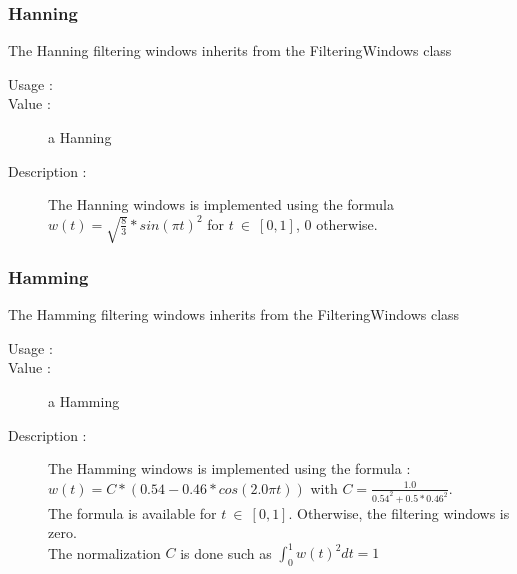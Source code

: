 \newpage \subsubsection{Hanning}

The Hanning filtering windows inherits from the FilteringWindows class

\begin{description}

\item[Usage :] \rule{0pt}{1em}
  \bigskip


\item[Value :] a Hanning 
  \rule{0pt}{1em}
  \bigskip

\item[Description :]  \rule{0pt}{1em}

The Hanning windows is implemented using the formula $w(t) =  \sqrt{\frac{8}{3}} * sin(\pi t)^2$ for $t\ \in \ [0,1]$, $0$ otherwise.

\end{description}


\newpage \subsubsection{Hamming}
The Hamming filtering windows inherits from the FilteringWindows class

\begin{description}

\item[Usage :] \rule{0pt}{1em}
  \bigskip


\item[Value :] a Hamming 
  \rule{0pt}{1em}
  \bigskip

\item[Description :]  \rule{0pt}{1em}

The Hamming windows is implemented using the formula : \\ $w(t) =  C * (0.54 - 0.46 * cos(2.0 \pi t))$ with $C = \frac{1.0}{0.54^2 + 0.5 * 0.46^2}$. \\
The formula is available for $t\ \in \ [0,1]$. Otherwise, the filtering windows is zero.\\
The normalization $C$ is done such as $\int_{0}^{1} w(t)^2 dt = 1 $
    

\end{description}



